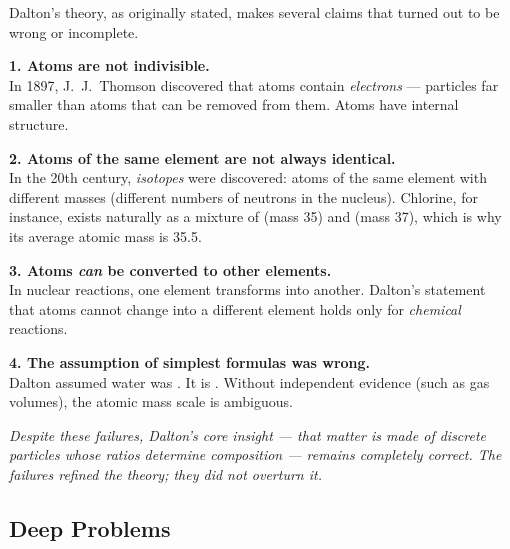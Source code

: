 \documentclass[12pt, a4paper]{book}
\theoremstyle{definition}
\newcommand{\newterm}[1]{\textit{\textcolor{DiscoveryColor}{#1}}}
\begin{document}
\begin{modelbreaks}
Dalton's theory, as originally stated, makes several claims
that turned out to be wrong or incomplete.

\textbf{1. Atoms are not indivisible.}\\
In 1897, J.~J.~Thomson discovered that atoms contain
\emph{electrons} --- particles far smaller than atoms
that can be removed from them.
Atoms have internal structure.

\textbf{2. Atoms of the same element are not always identical.}\\
In the 20th century, \newterm{isotopes} were discovered:
atoms of the same element with different masses
(different numbers of neutrons in the nucleus).
Chlorine, for instance, exists naturally as a mixture of
 (mass 35) and  (mass 37),
which is why its average atomic mass is 35.5.

\textbf{3. Atoms \emph{can} be converted to other elements.}\\
In nuclear reactions, one element transforms into another.
Dalton's statement that atoms cannot change into a different
element holds only for \emph{chemical} reactions.

\textbf{4. The assumption of simplest formulas was wrong.}\\
Dalton assumed water was .
It is .
Without independent evidence (such as gas volumes),
the atomic mass scale is ambiguous.

\vspace{0.4em}
\emph{Despite these failures, Dalton's core insight ---
that matter is made of discrete particles whose ratios
determine composition --- remains completely correct.
The failures refined the theory; they did not overturn it.}
\end{modelbreaks}

\subsection*{Deep Problems}
\end{document}
